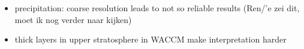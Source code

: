 \begin{itemize}
    \item precipitation: coarse resolution leads to not so reliable results (Ren/'e zei dit, moet ik nog verder naar kijken)
    \item thick layers in upper stratosphere in WACCM make interpretation harder
\end{itemize}